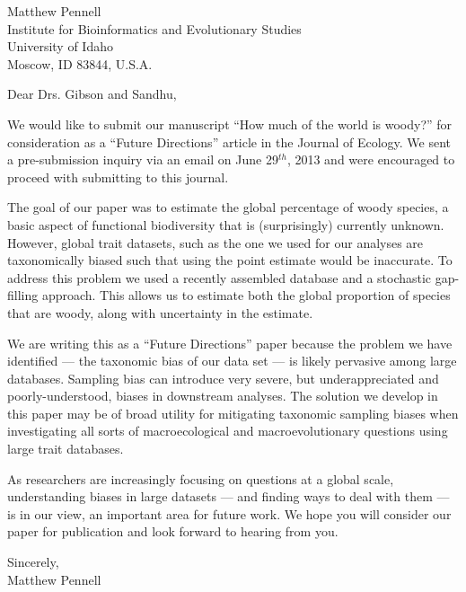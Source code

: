 \documentclass[a4paper,12pt]{article}
\begin{document}
{\raggedleft
  Matthew Pennell\\
  Institute for Bioinformatics and Evolutionary Studies\\
  University of Idaho\\
 Moscow, ID 83844, U.S.A.\\[2ex]
}

\vspace{3ex}

Dear Drs. Gibson and Sandhu,

We would like to submit our manuscript ``How much of the world is woody?'' for consideration as a ``Future Directions'' article in the Journal of Ecology. We sent a pre-submission inquiry via an email on June 29$^{th}$, 2013 and were encouraged to proceed with submitting to this journal.
					
The goal of our paper was to estimate the global percentage of woody species, a basic aspect of functional biodiversity that is (surprisingly) currently unknown. However, global trait datasets, such as the one we used for our analyses are taxonomically biased such that using the point estimate would be inaccurate. To address this problem we used a recently assembled database and a stochastic gap-filling approach. This allows us to estimate both the global proportion of species that are woody, along with uncertainty in the estimate. 

We are writing this as a ``Future Directions'' paper because the problem we have identified --- the taxonomic bias of our data set --- is likely pervasive among large databases. Sampling bias can introduce very severe, but underappreciated and poorly-understood, biases in downstream analyses. The solution we develop in this paper may be of broad utility for mitigating taxonomic sampling biases when investigating all sorts of macroecological and macroevolutionary questions using large trait databases.

As researchers are increasingly focusing on questions at a global scale, understanding biases in large datasets --- and finding ways to deal with them --- is in our view, an important area for future work. We hope you will consider our paper for publication and look forward to hearing from you.

\begin{flushright}
\vspace{2ex}
\hspace{.2\textwidth}Sincerely,\\
\hspace*{.3\textwidth}
Matthew Pennell
\end{flushright}
\end{document}
